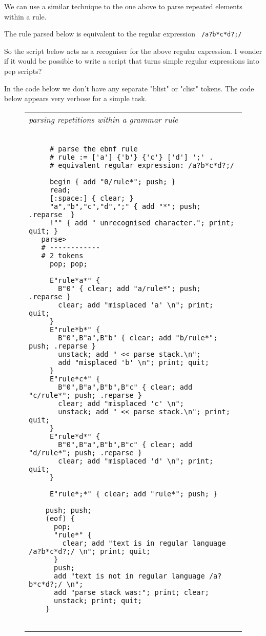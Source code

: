 \documentclass[a4paper,12pt]{article}
\begin{document}
  We can use a similar technique to the one above to parse repeated
  elements within a rule.

  The rule parsed below is equivalent to the regular expression 
 \verb| /a?b*c*d?;/ |

  So the script below acts as a recogniser for the above regular
  expression. I wonder if it would be possible to write a script
  that turns simple regular expressions into pep scripts?

  In the code below we don't have any separate "blist" or "clist" tokens.
  The code below appears very verbose for a simple task.
 \begin{figure}
 \begin{tabular}{ l }
 \emph{ parsing repetitions within a grammar rule } \\ 
 \begin{lstlisting}[breaklines] 

     # parse the ebnf rule
     # rule := ['a'] {'b'} {'c'} ['d'] ';' .
     # equivalent regular expression: /a?b*c*d?;/

     begin { add "0/rule*"; push; }
     read;
     [:space:] { clear; }
     "a","b","c","d",";" { add "*"; push; .reparse  }
     !"" { add " unrecognised character."; print; quit; }
   parse>
   # ------------
   # 2 tokens 
     pop; pop; 

     E"rule*a*" { 
       B"0" { clear; add "a/rule*"; push; .reparse }
       clear; add "misplaced 'a' \n"; print; quit; 
     } 
     E"rule*b*" { 
       B"0",B"a",B"b" { clear; add "b/rule*"; push; .reparse }
       unstack; add " << parse stack.\n"; 
       add "misplaced 'b' \n"; print; quit;
     } 
     E"rule*c*" { 
       B"0",B"a",B"b",B"c" { clear; add "c/rule*"; push; .reparse }
       clear; add "misplaced 'c' \n"; 
       unstack; add " << parse stack.\n"; print; quit;
     }
     E"rule*d*" { 
       B"0",B"a",B"b",B"c" { clear; add "d/rule*"; push; .reparse }
       clear; add "misplaced 'd' \n"; print; quit; 
     }

     E"rule*;*" { clear; add "rule*"; push; }

    push; push;
    (eof) {
      pop; 
      "rule*" { 
        clear; add "text is in regular language /a?b*c*d?;/ \n"; print; quit; 
      }
      push; 
      add "text is not in regular language /a?b*c*d?;/ \n"; 
      add "parse stack was:"; print; clear; 
      unstack; print; quit;
    } 
   
 \end{lstlisting} 
 \end{tabular} 

 \end{figure}
\end{document}
